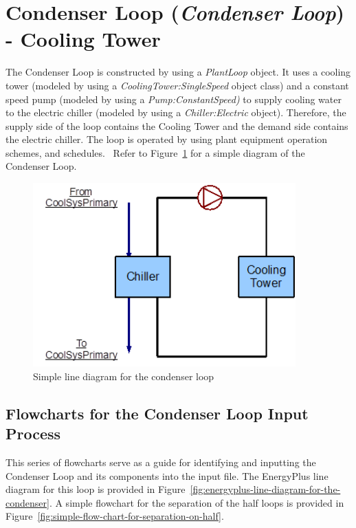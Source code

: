 \section{Condenser Loop (\emph{Condenser Loop}) - Cooling Tower}\label{condenser-loop-condenser-loop---cooling-tower}

The Condenser Loop is constructed by using a \emph{PlantLoop} object. It uses a cooling tower (modeled by using a \emph{CoolingTower:SingleSpeed} object class) and a constant speed pump (modeled by using a \emph{Pump:ConstantSpeed)} to supply cooling water to the electric chiller (modeled by using a \emph{Chiller:Electric} object). Therefore, the supply side of the loop contains the Cooling Tower and the demand side contains the electric chiller. The loop is operated by using plant equipment operation schemes, and schedules. ~Refer to Figure~\ref{fig:simple-line-diagram-for-the-condenser-loop} for a simple diagram of the Condenser Loop.

\begin{figure}[hbtp] %
\centering
\includegraphics[width=0.9\textwidth, height=0.9\textheight, keepaspectratio=true]{media/image061.png}
\caption{Simple line diagram for the condenser loop \protect \label{fig:simple-line-diagram-for-the-condenser-loop}}
\end{figure}

\subsection{Flowcharts for the Condenser Loop Input Process}\label{flowcharts-for-the-condenser-loop-input-process}

This series of flowcharts serve as a guide for identifying and inputting the Condenser Loop and its components into the input file. The EnergyPlus line diagram for this loop is provided in Figure~\ref{fig:energyplus-line-diagram-for-the-condenser}. A simple flowchart for the separation of the half loops is provided in Figure~\ref{fig:simple-flow-chart-for-separation-on-half}.

